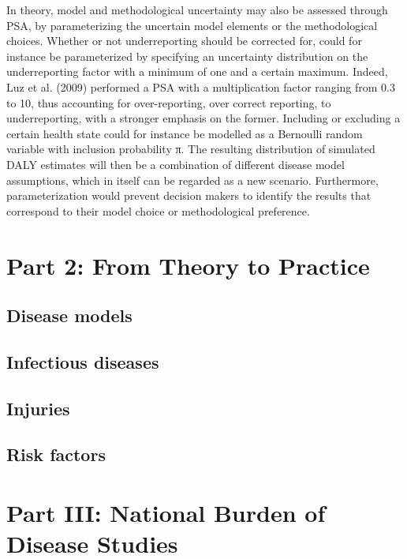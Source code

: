 \documentclass[]{book}
\begin{document}
In theory, model and methodological uncertainty may also be assessed
through PSA, by parameterizing the uncertain model elements or the
methodological choices. Whether or not underreporting should be
corrected for, could for instance be parameterized by specifying an
uncertainty distribution on the underreporting factor with a minimum of
one and a certain maximum. Indeed, Luz et al. (2009) performed a PSA
with a multiplication factor ranging from 0.3 to 10, thus accounting for
over-reporting, over correct reporting, to underreporting, with a
stronger emphasis on the former. Including or excluding a certain health
state could for instance be modelled as a Bernoulli random variable with
inclusion probability π. The resulting distribution of simulated DALY
estimates will then be a combination of different disease model
assumptions, which in itself can be regarded as a new scenario.
Furthermore, parameterization would prevent decision makers to identify
the results that correspond to their model choice or methodological
preference.

\part*{Part 2: From Theory to
Practice}\label{part-part-2-from-theory-to-practice}

\chapter{Disease models}\label{disease-models}

\chapter{Infectious diseases}\label{infectious-diseases}

\chapter{Injuries}\label{injuries}

\chapter{Risk factors}\label{risk-factors}

\part*{Part III: National Burden of Disease
Studies}\label{part-part-iii-national-burden-of-disease-studies}
\end{document}
